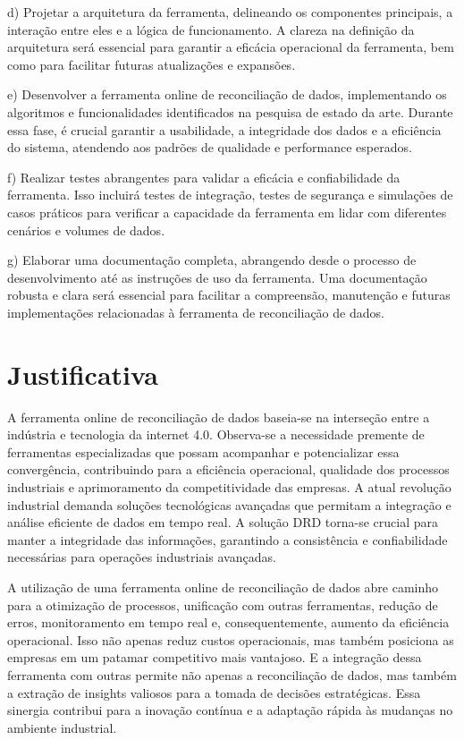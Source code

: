 d) Projetar a arquitetura da ferramenta, delineando os componentes principais, a interação entre eles e a lógica de funcionamento. A clareza na definição da arquitetura será essencial para garantir a eficácia operacional da ferramenta, bem como para facilitar futuras atualizações e expansões.

e) Desenvolver a ferramenta online de reconciliação de dados, implementando os algoritmos e funcionalidades identificados na pesquisa de estado da arte. Durante essa fase, é crucial garantir a usabilidade, a integridade dos dados e a eficiência do sistema, atendendo aos padrões de qualidade e performance esperados.

f) Realizar testes abrangentes para validar a eficácia e confiabilidade da ferramenta. Isso incluirá testes de integração, testes de segurança e simulações de casos práticos para verificar a capacidade da ferramenta em lidar com diferentes cenários e volumes de dados.

g) Elaborar uma documentação completa, abrangendo desde o processo de desenvolvimento até as instruções de uso da ferramenta. Uma documentação robusta e clara será essencial para facilitar a compreensão, manutenção e futuras implementações relacionadas à ferramenta de reconciliação de dados.

\section{Justificativa}

A ferramenta online de reconciliação de dados baseia-se na interseção entre a indústria e tecnologia da internet 4.0. Observa-se a necessidade premente de ferramentas especializadas que possam acompanhar e potencializar essa convergência, contribuindo para a eficiência operacional, qualidade dos processos industriais e aprimoramento da competitividade das empresas. A atual revolução industrial demanda soluções tecnológicas avançadas que permitam a integração e análise eficiente de dados em tempo real. A solução DRD torna-se crucial para manter a integridade das informações, garantindo a consistência e confiabilidade necessárias para operações industriais avançadas.

A utilização de uma ferramenta online de reconciliação de dados abre caminho para a otimização de processos, unificação com outras ferramentas, redução de erros, monitoramento em tempo real e, consequentemente, aumento da eficiência operacional. Isso não apenas reduz custos operacionais, mas também posiciona as empresas em um patamar competitivo mais vantajoso. E a integração dessa ferramenta com outras permite não apenas a reconciliação de dados, mas também a extração de insights valiosos para a tomada de decisões estratégicas. Essa sinergia contribui para a inovação contínua e a adaptação rápida às mudanças no ambiente industrial.

